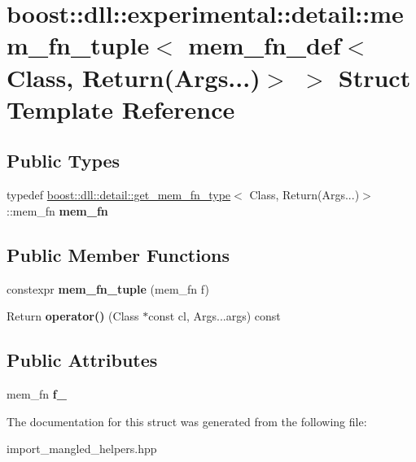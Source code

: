 \hypertarget{a00221}{}\section{boost\+:\+:dll\+:\+:experimental\+:\+:detail\+:\+:mem\+\_\+fn\+\_\+tuple$<$ mem\+\_\+fn\+\_\+def$<$ Class, Return(Args...)$>$ $>$ Struct Template Reference}
\label{a00221}
\subsection*{Public Types}
\begin{DoxyCompactItemize}
\item 
typedef \hyperlink{a00131}{boost\+::dll\+::detail\+::get\+\_\+mem\+\_\+fn\+\_\+type}$<$ Class, Return(Args...)$>$\+::mem\+\_\+fn {\bfseries mem\+\_\+fn}\hypertarget{a00221_a7c02503c22f0eba2ba3c9c6b877c2ee2}{}\label{a00221_a7c02503c22f0eba2ba3c9c6b877c2ee2}

\end{DoxyCompactItemize}
\subsection*{Public Member Functions}
\begin{DoxyCompactItemize}
\item 
constexpr {\bfseries mem\+\_\+fn\+\_\+tuple} (mem\+\_\+fn f)\hypertarget{a00221_a06b433063d7246de4378096547995c42}{}\label{a00221_a06b433063d7246de4378096547995c42}

\item 
Return {\bfseries operator()} (Class $\ast$const cl, Args...\+args) const \hypertarget{a00221_a8b3a9f520b5d7e8c916bd946f4d6c755}{}\label{a00221_a8b3a9f520b5d7e8c916bd946f4d6c755}

\end{DoxyCompactItemize}
\subsection*{Public Attributes}
\begin{DoxyCompactItemize}
\item 
mem\+\_\+fn {\bfseries f\+\_\+}\hypertarget{a00221_a7d61345644e21c2e433eaf5e459c9c74}{}\label{a00221_a7d61345644e21c2e433eaf5e459c9c74}

\end{DoxyCompactItemize}


The documentation for this struct was generated from the following file\+:\begin{DoxyCompactItemize}
\item 
import\+\_\+mangled\+\_\+helpers.\+hpp\end{DoxyCompactItemize}
